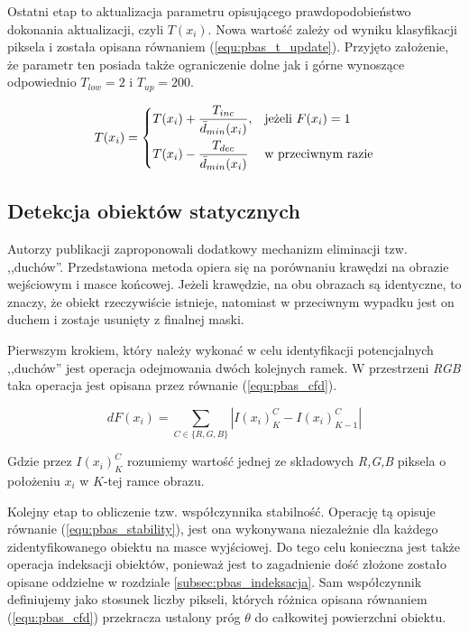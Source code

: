 Ostatni etap to aktualizacja parametru opisującego prawdopodobieństwo dokonania aktualizacji, czyli $T(x_i)$. Nowa wartość zależy od wyniku klasyfikacji piksela i została opisana równaniem (\ref{equ:pbas_t_update}). Przyjęto założenie, że parametr ten posiada także ograniczenie dolne jak i górne wynoszące odpowiednio $T_{low}=2$ i $T_{up}=200$. 

    \begin{equation}
	    T(x_i) = 
		\begin{dcases}
    		T(x_i) + \frac{T_{inc}}{\bar{d}_{min}(x_i)}, & \text{jeżeli } F(x_i)=1 \\
    		T(x_i) - \frac{T_{dec}}{\bar{d}_{min}(x_i)} & \text{w przeciwnym razie} 
		\end{dcases}
	\label{equ:pbas_t_update}	
	\end{equation}


\subsection{Detekcja obiektów statycznych}
\label{subsec:pbas_duchy}

Autorzy publikacji \cite{kryjak_14_pbas} zaproponowali dodatkowy mechanizm eliminacji tzw. ,,duchów''. Przedstawiona metoda opiera się na porównaniu krawędzi na obrazie wejściowym i masce końcowej. Jeżeli krawędzie, na obu obrazach są identyczne, to znaczy, że obiekt rzeczywiście istnieje, natomiast w przeciwnym wypadku jest on duchem i zostaje usunięty z finalnej maski. 

Pierwszym krokiem, który należy wykonać w celu identyfikacji potencjalnych ,,duchów'' jest operacja odejmowania dwóch kolejnych ramek. W przestrzeni \textit{RGB} taka operacja jest opisana przez równanie (\ref{equ:pbas_cfd}).

    \begin{equation}
        dF(x_i) = \sum_{C \in \{R,G,B\}} | I(x_i)_{K}^C - I(x_i)_{K-1}^C |
    \label{equ:pbas_cfd}
    \end{equation}
    
\noindent Gdzie przez $I(x_i)_{K}^C$ rozumiemy wartość jednej ze składowych \textit{R,G,B} piksela o położeniu $x_i$ w $K$-tej ramce obrazu.

Kolejny etap to obliczenie tzw. współczynnika stabilność. Operację tą opisuje równanie (\ref{equ:pbas_stability}), jest ona wykonywana niezależnie dla każdego zidentyfikowanego obiektu na masce wyjściowej. Do tego celu konieczna jest także operacja indeksacji obiektów, ponieważ jest to zagadnienie dość złożone zostało opisane oddzielne w rozdziale \ref{subsec:pbas_indeksacja}. Sam współczynnik definiujemy jako stosunek liczby pikseli, których różnica opisana równaniem (\ref{equ:pbas_cfd}) przekracza ustalony próg $\theta$ do całkowitej powierzchni obiektu.

